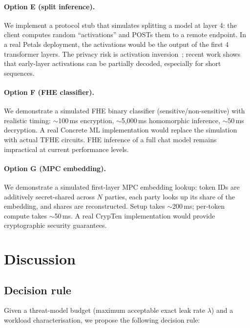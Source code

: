 \documentclass[11pt,a4paper]{article}
\begin{document}
\paragraph{Option E (split inference).}
We implement a protocol stub that simulates splitting a model at
layer 4: the client computes random ``activations'' and POSTs them
to a remote endpoint.  In a real Petals deployment, the activations
would be the output of the first 4 transformer layers.  The privacy
risk is activation inversion~\cite{activation-inversion}; recent
work shows that early-layer activations can be partially decoded,
especially for short sequences.

\paragraph{Option F (FHE classifier).}
We demonstrate a simulated FHE binary classifier
(sensitive/non-sensitive) with realistic timing:
$\sim$100\,ms encryption, $\sim$5{,}000\,ms homomorphic inference,
$\sim$50\,ms decryption.  A real Concrete ML implementation would
replace the simulation with actual TFHE circuits.  FHE inference
of a full chat model remains impractical at current performance
levels.

\paragraph{Option G (MPC embedding).}
We demonstrate a simulated first-layer MPC embedding lookup:
token IDs are additively secret-shared across $N$ parties, each
party looks up its share of the embedding, and shares are
reconstructed.  Setup takes $\sim$200\,ms; per-token compute
takes $\sim$50\,ms.  A real CrypTen implementation would provide
cryptographic security guarantees.

\section{Discussion}
\label{sec:discussion}

\subsection{Decision rule}

Given a threat-model budget (maximum acceptable exact leak rate
$\lambda$) and a workload characterisation, we propose the
following decision rule:
\end{document}
